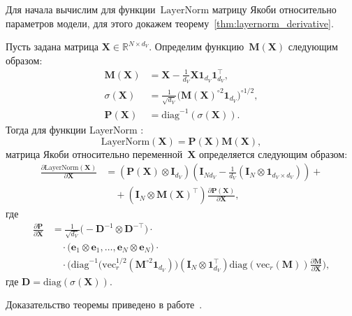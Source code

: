 Для начала вычислим для функции~$\mathrm{LayerNorm}$ матрицу Якоби относительно параметров модели, для этого докажем теорему~\ref{thm:layernorm_derivative}.
\begin{theorem}\label{thm:layernorm_derivative}
    Пусть задана матрица $\mathbf{X} \in \mathbb{R}^{N \times d_V}$. Определим функцию~$\mathbf{M}(\mathbf{X})$ следующим образом:
    \begin{align}
        \mathbf{M}(\mathbf{X}) &= \mathbf{X} - \tfrac{1}{d_V}\mathbf{X}\mathbf{1}_{d_V}\mathbf{1}_{d_V}^\top, \\
        \sigma(\mathbf{X}) &= \tfrac{1}{\sqrt{d_V}}\big(\mathbf{M}(\mathbf{X})^{\circ 2}\mathbf{1}_{d_V}\big)^{\circ 1/2},\\
        \mathbf{P}(\mathbf{X}) &= \mathrm{diag}^{-1}(\sigma(\mathbf{X})).
    \end{align}
    Тогда для функции LayerNorm :
    \[
        \text{LayerNorm}(\mathbf{X}) = \mathbf{P}(\mathbf{X}) \mathbf{M}(\mathbf{X}),
    \]
    матрица Якоби относительно переменной~$\mathbf{X}$ определяется следующим образом:
    \begin{align}
        \frac{\partial \text{LayerNorm}(\mathbf{X})}{\partial \mathbf{X}} &= (\mathbf{P}(\mathbf{X}) \otimes \mathbf{I}_{d_V}) \left(\mathbf{I}_{N d_V} - \tfrac{1}{d_V}(\mathbf{I}_{N} \otimes \mathbf{1}_{d_V \times d_V})\right)+\\
    &\quad+\left(\mathbf{I}_{N} \otimes \mathbf{M}(\mathbf{X})^\top\right)\frac{\partial\mathbf{P}(\mathbf{X})}{\partial\mathbf{X}},
    \end{align}
    где
    \begin{align}
    \frac{\partial \mathbf{P}}{\partial \mathbf{X}}&=\frac{1}{\sqrt{d_V}}\Big( -\mathbf{D}^{-1} \otimes \mathbf{D}^{-\top} \Big)\cdot\\
    &\quad\cdot\big( \mathbf{e}_1 \otimes \mathbf{e}_1, \dots, \mathbf{e}_N \otimes \mathbf{e}_N \big)\cdot\\
    &\quad\cdot\Big(\mathrm{diag}^{-1}\!\big(\mathrm{vec}_r^{1/2}(\mathbf{M}^{\circ 2}\mathbf{1}_{d_V})\big)(\mathbf{I}_{N} \otimes \mathbf{1}_{d_V}^\top)\mathrm{diag}\left(\mathrm{vec}_r(\mathbf{M})\right)\frac{\partial \mathbf{M}}{\partial \mathbf{X}}\Big),
    \end{align}
    где $\mathbf{D} = \mathrm{diag}(\sigma(\mathbf{X})).$
\end{theorem}
Доказательство теоремы приведено в работе~\cite{petrov2025curvaturegap}.

